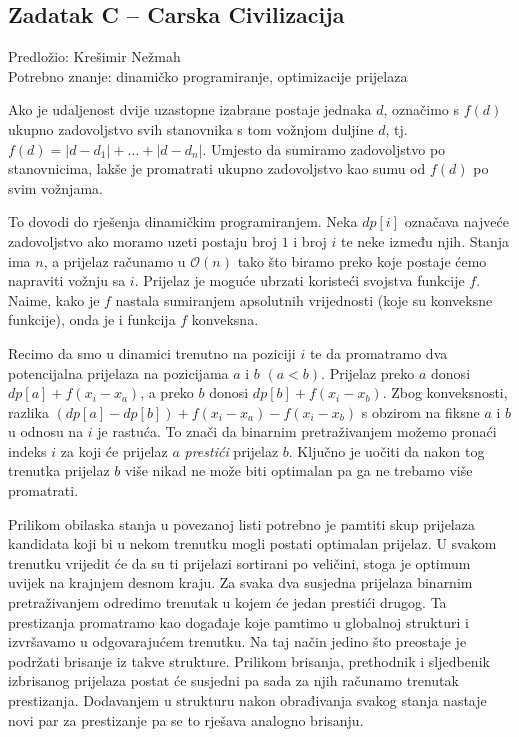 \documentclass[a4paper]{article}
\begin{document}
\subsection*{Zadatak C -- Carska Civilizacija}
\textsf{Predložio: Krešimir Nežmah}\\
\textsf{Potrebno znanje: dinamičko programiranje, optimizacije prijelaza}

Ako je udaljenost dvije uzastopne izabrane postaje jednaka $d$, označimo s
$f(d)$ ukupno zadovoljstvo svih stanovnika s tom vožnjom duljine $d$, tj. $f(d)
= |d-d_1|+\ldots+|d-d_n|$.  Umjesto da sumiramo zadovoljstvo po stanovnicima,
lakše je promatrati ukupno zadovoljstvo kao sumu od $f(d)$ po svim vožnjama.

To dovodi do rješenja dinamičkim programiranjem. Neka $dp[i]$ označava najveće
zadovoljstvo ako moramo uzeti postaju broj $1$ i broj $i$ te neke između njih.
Stanja ima $n$, a prijelaz računamo u $\mathcal{O}(n)$ tako što biramo preko
koje postaje ćemo napraviti vožnju sa $i$.  Prijelaz je moguće ubrzati
koristeći svojstva funkcije $f$. Naime, kako je $f$ nastala sumiranjem
apsolutnih vrijednosti (koje su konveksne funkcije), onda je i funkcija $f$
konveksna.

Recimo da smo u dinamici trenutno na poziciji $i$ te da promatramo dva
potencijalna prijelaza na pozicijama $a$ i $b$ $(a < b)$. Prijelaz preko $a$
donosi $dp[a] + f(x_i - x_a)$, a preko $b$ donosi $dp[b] + f(x_i - x_b)$. Zbog
konveksnosti, razlika $(dp[a] - dp[b]) + f(x_i - x_a) - f(x_i - x_b)$ s obzirom
na fiksne $a$ i $b$ u odnosu na $i$ je rastuća. To znači da binarnim
pretraživanjem možemo pronaći indeks $i$ za koji će prijelaz $a$
\textit{prestići} prijelaz $b$. Ključno je uočiti da nakon tog trenutka
prijelaz $b$ više nikad ne može biti optimalan pa ga ne trebamo više
promatrati.

Prilikom obilaska stanja u povezanoj listi potrebno je pamtiti skup prijelaza
kandidata koji bi u nekom trenutku mogli postati optimalan prijelaz. U svakom
trenutku vrijedit će da su ti prijelazi sortirani po veličini, stoga je optimum
uvijek na krajnjem desnom kraju. Za svaka dva susjedna prijelaza binarnim
pretraživanjem odredimo trenutak u kojem će jedan prestići drugog. Ta
prestizanja promatramo kao događaje koje pamtimo u globalnoj strukturi i
izvršavamo u odgovarajućem trenutku. Na taj način jedino što preostaje je
podržati brisanje iz takve strukture. Prilikom brisanja, prethodnik i
sljedbenik izbrisanog prijelaza postat će susjedni pa sada za njih računamo
trenutak prestizanja. Dodavanjem u strukturu nakon obrađivanja svakog stanja
nastaje novi par za prestizanje pa se to rješava analogno brisanju.
\end{document}
